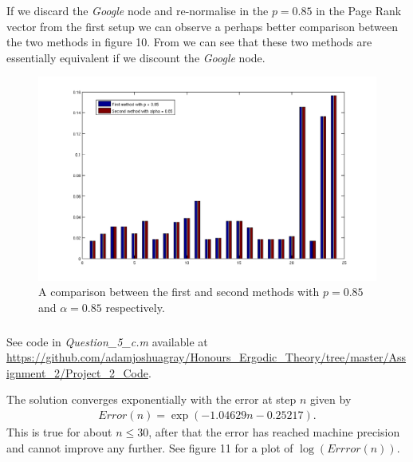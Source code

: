 \documentclass{unswmaths}
\begin{document}
If we discard the \emph{Google} node and re-normalise in the $ p = 0.85 $ in the Page Rank vector from the first setup we can observe a perhaps better comparison between the two methods in figure 10. From we can see that these two methods are essentially equivalent if we discount the \emph{Google} node.

\begin{figure}[h]
    \includegraphics[scale=0.4]{Comparison}
    \caption{A comparison between the first and second methods with $ p = 0.85 $ and $ \alpha = 0.85 $ respectively.}
\end{figure}


\subsubsection{}
See code in \emph{Question\_5\_c.m} available at \url{https://github.com/adamjoshuagray/Honours_Ergodic_Theory/tree/master/Assignment_2/Project_2_Code}. 

The solution converges exponentially with the error at step $ n $ given by
\begin{align*}
    Error(n) = \exp(-1.04629n - 0.25217).
\end{align*}
This is true for about $ n \leq 30 $, after that the error has reached machine precision and cannot improve any further. See figure 11 for a plot of $ \log(Errror(n)) $.
\end{document}
